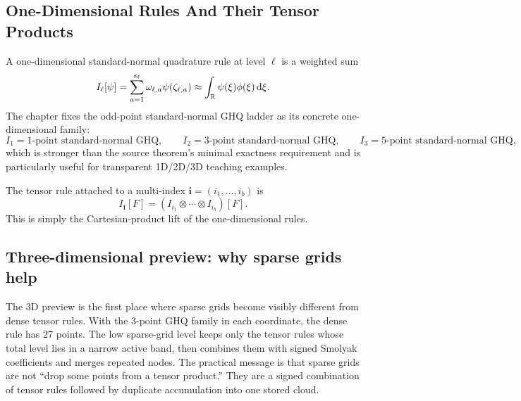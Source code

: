 \subsection{One-Dimensional Rules And Their Tensor Products}
\label{sec:p31-ghq}

A one-dimensional standard-normal quadrature rule at level \(\ell\) is a weighted
sum
\begin{equation}
  I_\ell[\psi]
  =
  \sum_{a=1}^{s_\ell}\omega_{\ell,a}\psi(\zeta_{\ell,a})
  \approx
  \int_{\mathbb{R}}\psi(\xi)\phi(\xi)\,\mathrm d \xi.
  \label{eq:p31-univariate-rule}
\end{equation}
The chapter fixes the odd-point standard-normal GHQ ladder as its concrete
one-dimensional family:
\begin{equation}
  I_1 = \text{1-point standard-normal GHQ},
  \qquad
  I_2 = \text{3-point standard-normal GHQ},
  \qquad
  I_3 = \text{5-point standard-normal GHQ},
  \label{eq:p41-ghq-family}
\end{equation}
which is stronger than the source theorem’s minimal exactness requirement and is
particularly useful for transparent 1D/2D/3D teaching examples.

The tensor rule attached to a multi-index \(\mathbf i=(i_1,\ldots,i_b)\) is
\begin{equation}
  I_{\mathbf i}[F]
  =
  (I_{i_1}\otimes\cdots\otimes I_{i_b})[F].
  \label{eq:p31-tensor-rule}
\end{equation}
This is simply the Cartesian-product lift of the one-dimensional rules.

\subsection{Three-dimensional preview: why sparse grids help}
\label{sec:p38-three-dimensional-preview}

The 3D preview is the first place where sparse grids become visibly different
from dense tensor rules.  With the 3-point GHQ family in each coordinate, the
dense rule has 27 points.  The low sparse-grid level keeps only the tensor rules
whose total level lies in a narrow active band, then combines them with signed
Smolyak coefficients and merges repeated nodes.  The practical message is that
sparse grids are not “drop some points from a tensor product.”  They are a
signed combination of tensor rules followed by duplicate accumulation into one
stored cloud.

